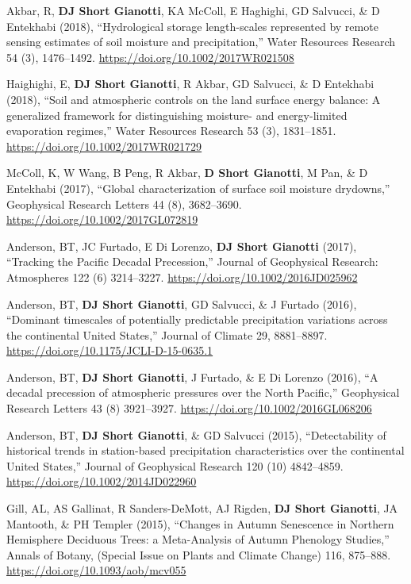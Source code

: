 \documentclass[10pt, a4paper]{article}
\newcommand{\lbr}{\vspace*{12pt}}
\newcommand{\years}[1]{\mbox{}\marginnote{\scriptsize #1}} %
\begin{document}
\years{2018b}Akbar, R, \textbf{DJ Short Gianotti}, KA McColl, E Haghighi, GD Salvucci, \& D Entekhabi (2018), ``Hydrological storage length-scales represented by remote sensing estimates of soil moisture and precipitation,'' Water Resources Research 54 (3), 1476--1492. \url{ https://doi.org/10.1002/2017WR021508}\lbr

\years{2018a}Haighighi, E, \textbf{DJ Short Gianotti}, R Akbar, GD Salvucci, \& D Entekhabi (2018), ``Soil and atmospheric controls on the land surface energy balance: A generalized framework for distinguishing moisture- and energy-limited evaporation regimes,'' Water Resources Research 53 (3), 1831--1851. \url{https://doi.org/10.1002/2017WR021729} \lbr

\years{2017b}McColl, K, W Wang, B Peng, R Akbar, \textbf{D Short Gianotti}, M Pan, \& D Entekhabi (2017), ``Global characterization of surface soil moisture drydowns,'' Geophysical Research Letters 44 (8), 3682--3690. \url{https://doi.org/10.1002/2017GL072819} \lbr

\years{2017a}Anderson, BT, JC Furtado, E Di Lorenzo, \textbf{DJ Short Gianotti} (2017), ``Tracking the Pacific Decadal Precession,'' Journal of Geophysical Research: Atmospheres 122 (6) 3214--3227. \url{https://doi.org/10.1002/2016JD025962} \lbr

\years{2016b}Anderson, BT, \textbf{DJ Short Gianotti}, GD Salvucci, \& J Furtado (2016), ``Dominant timescales of potentially predictable precipitation variations across the continental United States,'' Journal of Climate 29, 8881--8897. \url{https://doi.org/10.1175/JCLI-D-15-0635.1} \lbr

\years{2016a}Anderson, BT, \textbf{DJ Short Gianotti}, J Furtado, \& E Di Lorenzo (2016), ``A decadal precession of atmospheric pressures over the North Pacific,'' Geophysical Research Letters 43 (8) 3921--3927. \url{https://doi.org/10.1002/2016GL068206} \lbr

\years{2015c}Anderson, BT, \textbf{DJ Short Gianotti}, \& GD Salvucci (2015), ``Detectability of historical trends in station-based precipitation characteristics over the continental United States,'' Journal of Geophysical Research 120 (10) 4842--4859. \url{https://doi.org/10.1002/2014JD022960} \lbr

\years{2015b}Gill, AL, AS Gallinat, R Sanders-DeMott, AJ Rigden, \textbf{DJ Short Gianotti}, JA Mantooth, \& PH Templer (2015), ``Changes in Autumn Senescence in Northern Hemisphere Deciduous Trees: a Meta-Analysis of Autumn Phenology Studies,'' Annals of Botany, (Special Issue on Plants and Climate Change) 116, 875--888. \url{https://doi.org/10.1093/aob/mcv055} \lbr
\end{document}
